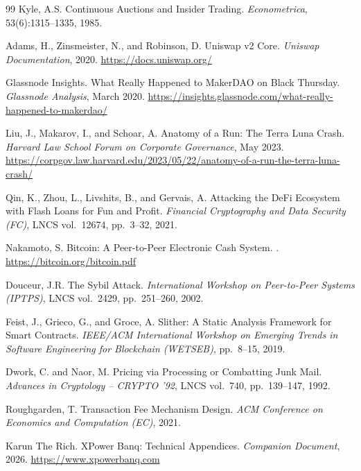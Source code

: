 \documentclass[10pt,a4paper,twocolumn]{article}
\theoremstyle{definition}
\theoremstyle{plain}
\theoremstyle{remark}
\begin{document}
\begin{thebibliography}{99}
Kyle, A.S.
\newblock Continuous Auctions and Insider Trading.
\newblock \emph{Econometrica}, 53(6):1315--1335, 1985.


Adams, H., Zinsmeister, N., and Robinson, D.
\newblock Uniswap v2 Core.
\newblock \emph{Uniswap Documentation}, 2020.
\newblock \url{https://docs.uniswap.org/}

Glassnode Insights.
\newblock What Really Happened to MakerDAO on Black Thursday.
\newblock \emph{Glassnode Analysis}, March 2020.
\newblock \url{https://insights.glassnode.com/what-really-happened-to-makerdao/}

Liu, J., Makarov, I., and Schoar, A.
\newblock Anatomy of a Run: The Terra Luna Crash.
\newblock \emph{Harvard Law School Forum on Corporate Governance}, May 2023.
\newblock \url{https://corpgov.law.harvard.edu/2023/05/22/anatomy-of-a-run-the-terra-luna-crash/}

Qin, K., Zhou, L., Livshits, B., and Gervais, A.
\newblock Attacking the DeFi Ecosystem with Flash Loans for Fun and Profit.
\newblock \emph{Financial Cryptography and Data Security (FC)}, LNCS vol.~12674, pp.~3--32, 2021.

Nakamoto, S.
\newblock Bitcoin: A Peer-to-Peer Electronic Cash System.
.
\newblock \url{https://bitcoin.org/bitcoin.pdf}

Douceur, J.R.
\newblock The Sybil Attack.
\newblock \emph{International Workshop on Peer-to-Peer Systems (IPTPS)}, LNCS vol.~2429, pp.~251--260, 2002.

Feist, J., Grieco, G., and Groce, A.
\newblock Slither: A Static Analysis Framework for Smart Contracts.
\newblock \emph{IEEE/ACM International Workshop on Emerging Trends in Software Engineering for Blockchain (WETSEB)}, pp.~8--15, 2019.

Dwork, C. and Naor, M.
\newblock Pricing via Processing or Combatting Junk Mail.
\newblock \emph{Advances in Cryptology -- CRYPTO '92}, LNCS vol.~740, pp.~139--147, 1992.

Roughgarden, T.
\newblock Transaction Fee Mechanism Design.
\newblock \emph{ACM Conference on Economics and Computation (EC)}, 2021.

Karun The Rich.
\newblock XPower Banq: Technical Appendices.
\newblock \emph{Companion Document}, 2026.
\newblock \url{https://www.xpowerbanq.com}

\end{thebibliography}
\end{document}
